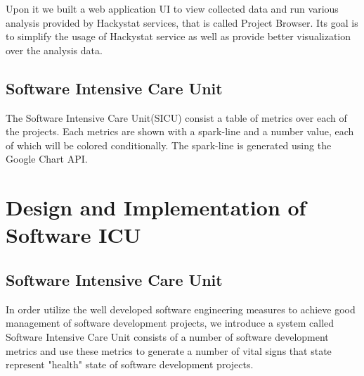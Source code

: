 Upon it we built a web application UI to view collected data and run various analysis provided by Hackystat services, that is called Project Browser. Its goal is to simplify the usage of Hackystat service as well as provide better visualization over the analysis data.


\section {Software Intensive Care Unit}
The Software Intensive Care Unit(SICU) consist a table of metrics over each of the projects. Each metrics are shown with a spark-line and a number value, each of which will be colored conditionally. The spark-line is generated using the Google Chart API.\cite{googlechart}

\chapter{Design and Implementation of Software ICU}
\section{Software Intensive Care Unit}
In order utilize the well developed software engineering measures to achieve good management of software development projects, we introduce a system called Software Intensive Care Unit consists of a number of software development metrics and use these metrics to generate a number of vital signs that state represent "health" state of software development projects.

